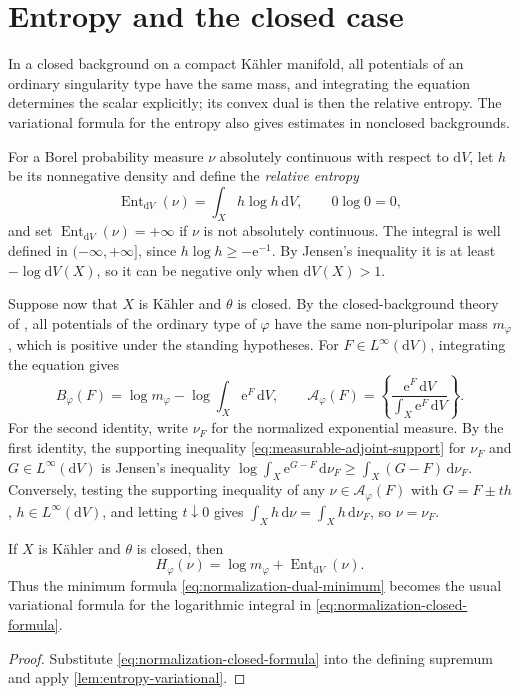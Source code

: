 \section{Entropy and the closed case}\label{sec:normalization-entropy}

In a closed background on a compact K\"ahler manifold, all potentials of an ordinary singularity type have the same mass, and integrating the equation determines the scalar explicitly; its convex dual is then the relative entropy. The variational formula for the entropy also gives estimates in nonclosed backgrounds.

For a Borel probability measure $\nu$ absolutely continuous with respect to $\mathrm{d}V$, let $h$ be its nonnegative density and define the \emph{relative entropy}
\[
 \operatorname{Ent}_{\mathrm{d}V}(\nu)=\int_Xh\log h\,\mathrm{d}V,
 \qquad 0\log0=0,
\]
and set $\operatorname{Ent}_{\mathrm{d}V}(\nu)=+\infty$ if $\nu$ is not absolutely continuous. The integral is well defined in $(-\infty,+\infty]$, since $h\log h\geq-\mathrm{e}^{-1}$. By Jensen's inequality it is at least $-\log\mathrm{d}V(X)$, so it can be negative only when $\mathrm{d}V(X)>1$.



Suppose now that $X$ is K\"ahler and $\theta$ is closed. By the closed-background theory of \cite{SGPT}, all potentials of the ordinary type of $\varphi$ have the same non-pluripolar mass $m_\varphi$, which is positive under the standing hypotheses. For $F\in L^\infty(\mathrm{d}V)$, integrating the equation gives
\begin{equation}\label{eq:normalization-closed-formula}
 B_\varphi(F)=\log m_\varphi-\log\int_X\mathrm{e}^F\,\mathrm{d}V,
 \qquad
 \mathcal A_\varphi(F)
 =\left\{\frac{\mathrm{e}^F\,\mathrm{d}V}{\int_X\mathrm{e}^F\,\mathrm{d}V}\right\}.
\end{equation}
For the second identity, write $\nu_F$ for the normalized exponential measure. By the first identity, the supporting inequality \eqref{eq:measurable-adjoint-support} for $\nu_F$ and $G\in L^\infty(\mathrm{d}V)$ is Jensen's inequality $\log\int_X\mathrm{e}^{G-F}\,\mathrm{d}\nu_F\geq\int_X(G-F)\,\mathrm{d}\nu_F$. Conversely, testing the supporting inequality of any $\nu\in\mathcal A_\varphi(F)$ with $G=F\pm th$, $h\in L^\infty(\mathrm{d}V)$, and letting $t\downarrow0$ gives $\int_Xh\,\mathrm{d}\nu=\int_Xh\,\mathrm{d}\nu_F$, so $\nu=\nu_F$.

\begin{proposition}\label{prop:normalization-dual-entropy}
If $X$ is K\"ahler and $\theta$ is closed, then
\[
 H_\varphi(\nu)=\log m_\varphi+\operatorname{Ent}_{\mathrm{d}V}(\nu).
\]
Thus the minimum formula \eqref{eq:normalization-dual-minimum} becomes the usual variational formula for the logarithmic integral in \eqref{eq:normalization-closed-formula}.
\end{proposition}
\begin{proof}
Substitute \eqref{eq:normalization-closed-formula} into the defining supremum and apply \cref{lem:entropy-variational}.
\end{proof}

